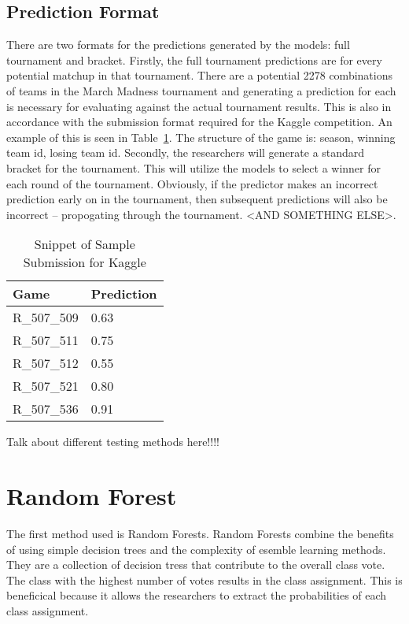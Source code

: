 \documentclass[conference]{IEEEtran}
\begin{document}
\subsection{Prediction Format}
There are two formats for the predictions generated by the models: full tournament and bracket. Firstly, the full tournament predictions are for every potential matchup in that tournament. There are a potential 2278 combinations of teams in the March Madness tournament and generating a prediction for each is necessary for evaluating against the actual tournament results. This is also in accordance with the submission format required for the Kaggle competition. An example of this is seen in Table~\ref{tab:kaggle}. The structure of the game is: season, winning team id, losing team id. Secondly, the researchers will generate a standard bracket for the tournament. This will utilize the models to select a winner for each round of the tournament. 
Obviously, if the predictor makes an incorrect prediction early on in the tournament, then subsequent predictions will also be incorrect -- propogating through the tournament. <AND SOMETHING ELSE>.

\begin{table}[H]
\begin{centering}
    \begin{tabular}{|l|l|}
    \hline
    Game        & Prediction \\ \hline
    R\_507\_509 & 0.63       \\ 
    R\_507\_511 & 0.75       \\ 
    R\_507\_512 & 0.55       \\ 
    R\_507\_521 & 0.80       \\ 
    R\_507\_536 & 0.91       \\ \hline
    \end{tabular}
    \label{tab:kaggle}
    \caption{Snippet of Sample Submission for Kaggle}
    \end{centering}
\end{table}

Talk about different testing methods here!!!!

\section{Random Forest}
The first method used is Random Forests. Random Forests combine the benefits of using simple decision trees and the complexity of esemble learning methods. They are a collection of decision tress that contribute to the overall class vote. The class with the highest number of votes results in the class assignment. This is beneficical because it allows the researchers to extract the probabilities of each class assignment. 
\end{document}
